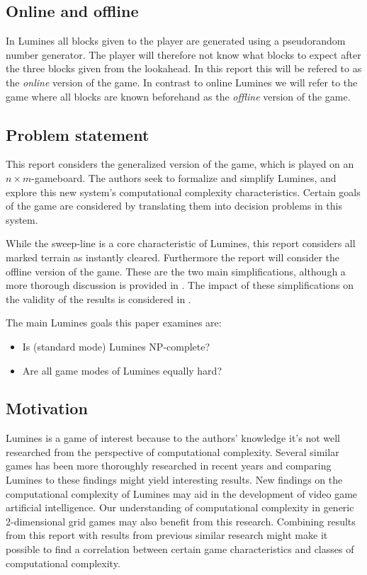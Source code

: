 \subsection{Online and offline}
In Lumines all blocks given to the player are generated using a pseudorandom number generator. The player will therefore not know what blocks to expect after the three blocks given from the lookahead. In this report this will be refered to as the \textit{online} version of the game. In contrast to online Lumines we will refer to the game where all blocks are known beforehand as the \textit{offline} version of the game.

\subsection{Problem statement}
This report considers the generalized version of the game, which is played on an $n \times m$-gameboard. The authors seek to formalize and simplify Lumines, and explore this new system's computational complexity characteristics. Certain goals of the game are considered by translating them into decision problems in this system.

While the sweep-line is a core characteristic of Lumines, this report considers all marked terrain as instantly cleared. Furthermore the report will consider the offline version of the game. These are the two main simplifications, although a more thorough discussion is provided in . The impact of these simplifications on the validity of the results is considered in .

The main Lumines goals this paper examines are:
\begin{itemize}
        \item Is (standard mode) Lumines NP-complete?
        \item Are all game modes of Lumines equally hard?
\end{itemize}

\subsection{Motivation}

Lumines is a game of interest because to the authors' knowledge it's not well researched from the perspective of computational complexity. Several similar games has been more thoroughly researched in recent years and comparing Lumines to these findings might yield interesting results. New findings on the computational complexity of Lumines may aid in the development of video game artificial intelligence. Our understanding of computational complexity in generic 2-dimensional grid games may also benefit from this research. Combining results from this report with results from previous similar research might make it possible to find a correlation between certain game characteristics and classes of computational complexity.
